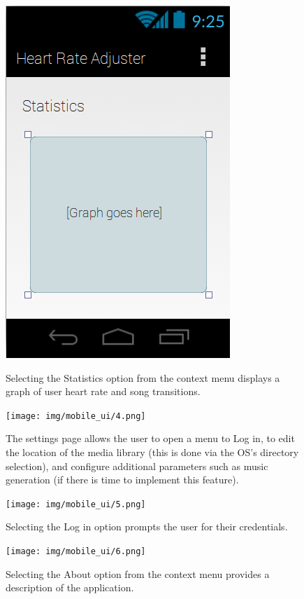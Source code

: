 \documentclass[letterpaper,english, 12pt]{scrreprt}
\begin{document}
\begin{figure}[H]
	\centering
	\includegraphics{img/mobile_ui/7.png}\\
	\caption{Selecting the Statistics option from the context menu displays a graph of user heart rate and song transitions.}
\end{figure}

\begin{figure}[H]
	\centering
	\texttt{[image: img/mobile\_ui/4.png]}\\
	\caption{The settings page allows the user to open a menu to Log in, to edit the location of the media library (this is done via the OS's directory selection), and configure additional parameters such as music generation (if there is time to implement this feature).}
\end{figure}

\begin{figure}[H]
	\centering
	\texttt{[image: img/mobile\_ui/5.png]}\\
	\caption{Selecting the Log in option prompts the user for their credentials.}
\end{figure}

\begin{figure}[H]
	\centering
	\texttt{[image: img/mobile\_ui/6.png]}\\
	\caption{Selecting the About option from the context menu provides a description of the application.}
\end{figure}
\end{document}
